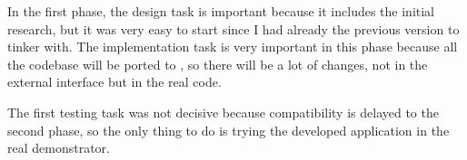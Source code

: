 In the first phase, the design task is important because it includes the initial research, but it was very easy to start since I had already the previous version to tinker with.
The implementation task is very important in this phase because all the  codebase will be ported to , so there will be a lot of changes, not in the external interface but in the real code.

The first testing task was not decisive because  compatibility is delayed to the second phase, so the only thing to do is trying the developed application in the real demonstrator.

\begin{landscape}
\addtolength{\headsep}{3cm}
\parbox[c][\textwidth][s]{\linewidth}{%
\vfill
{}
\label{fig:gannt-diagram}%
\vfill
}
\end{landscape}

